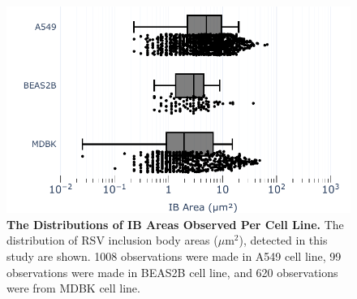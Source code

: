 \begin{figure}
    \centering
    \includegraphics[width=1\linewidth]{08. Chapter 3/Figs/01. Localisation introduction/06. box-infection.pdf}
    \caption[The Distributions of IB Areas Observed Per Cell Line.]{\textbf{The Distributions of IB Areas Observed Per Cell Line.} The distribution of RSV inclusion body areas (\(\mu \mbox{m}^2\)), detected in this study are shown. 1008 observations were made in A549 cell line, 99 observations were made in BEAS2B cell line, and 620 observations were from MDBK cell line.}
    \label{fig:The Distributions of IB Areas Observed Per Cell Line}
\end{figure}